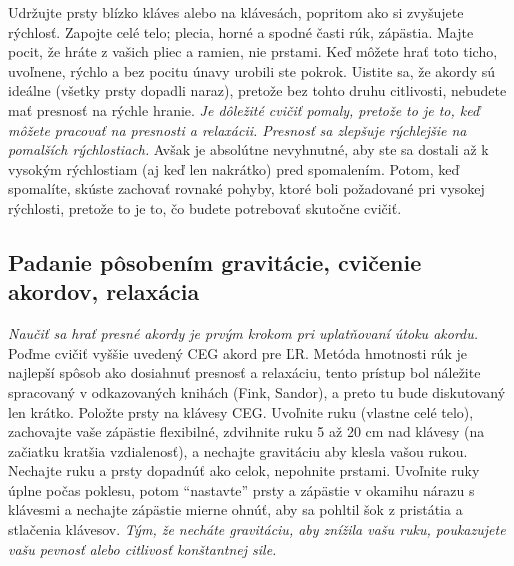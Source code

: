 Udržujte prsty blízko kláves alebo na klávesách, popritom ako si zvyšujete rýchlosť. Zapojte celé telo; plecia, horné a spodné časti rúk, zápästia. Majte pocit, že hráte z vašich pliec a ramien, nie prstami. Keď môžete hrať toto ticho, uvoľnene, rýchlo a bez pocitu únavy urobili ste pokrok. Uistite sa, že akordy sú ideálne (všetky prsty dopadli naraz), pretože bez tohto druhu citlivosti, nebudete mať presnosť na rýchle hranie. \emph{Je dôležité cvičiť pomaly, pretože to je to, keď môžete pracovať na presnosti a relaxácii. Presnosť sa zlepšuje rýchlejšie na pomalších rýchlostiach.} Avšak je absolútne nevyhnutné, aby ste sa dostali až k vysokým rýchlostiam (aj keď len nakrátko) pred spomalením. Potom, keď spomalíte, skúste zachovať rovnaké pohyby, ktoré boli požadované pri vysokej rýchlosti, pretože to je to, čo budete potrebovať skutočne cvičiť.

\subsection{Padanie pôsobením gravitácie, cvičenie akordov, relaxácia}
\emph{Naučiť sa hrať presné akordy je prvým krokom pri uplatňovaní útoku akordu.} Poďme cvičiť vyššie uvedený CEG akord pre ĽR. Metóda hmotnosti rúk je najlepší spôsob ako dosiahnuť presnosť a relaxáciu, tento prístup bol náležite spracovaný v odkazovaných knihách (Fink, Sandor), a preto tu bude diskutovaný len krátko. Položte prsty na klávesy CEG. Uvoľnite ruku (vlastne celé telo), zachovajte vaše zápästie flexibilné, zdvihnite ruku 5 až 20 cm nad klávesy (na začiatku kratšia vzdialenosť), a nechajte gravitáciu aby klesla vašou rukou. Nechajte ruku a prsty dopadnúť ako celok, nepohnite prstami. Uvoľnite ruky úplne počas poklesu, potom “nastavte” prsty a zápästie v okamihu nárazu s klávesmi a nechajte zápästie mierne ohnúť, aby sa pohltil šok z pristátia a stlačenia klávesov. \emph{Tým, že necháte gravitáciu, aby znížila vašu ruku, poukazujete vašu pevnosť alebo citlivosť  konštantnej sile.}

